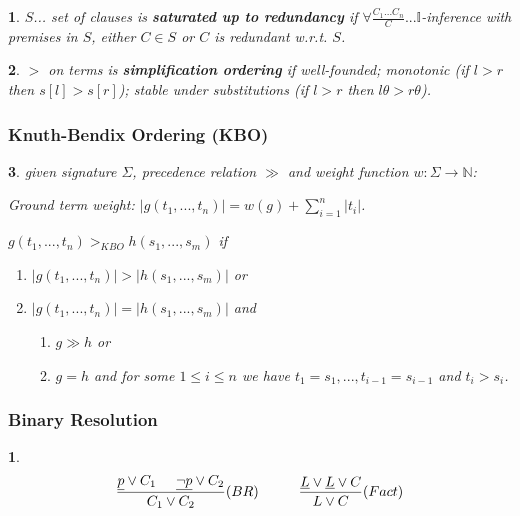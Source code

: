 \documentclass[9pt]{extarticle}
\theoremstyle{theoremstyle}
\newtheorem*{green}{}
\newtheorem*{blue}{}
\begin{document}
\begin{multicols}{3}
\begin{minipage}[t]{.30\textwidth}
\begin{green}
	$S$... set of clauses is \textbf{saturated up to redundancy} if $\forall \frac{C_1...C_n}{C} ... \mathbb{I}$-inference with premises in $S$, either $C \in S$ or $C$ is redundant w.r.t. $S$.
\end{green}

\begin{green}
	$>$ on terms is \textbf{simplification ordering} if well-founded; monotonic (if $l>r$ then $s[l]>s[r]$); stable under substitutions (if $l>r$ then $l\theta > r\theta$).
\end{green}

\end{minipage}

\newpage

\begin{minipage}[t]{.30\textwidth}
	
\subsubsection*{Knuth-Bendix Ordering (KBO)}
\begin{green}
	given signature $\Sigma$, precedence relation $\gg$ and weight function $w:\Sigma \rightarrow \mathbb{N}$:
	
	Ground term weight: $|g(t_1,...,t_n)| = w(g)+ \sum_{i=1}^{n}|t_i|$.
	
	$g(t_1,...,t_n) >_{KBO} h(s_1,...,s_m)$ if
	\begin{enumerate}
		\item $|g(t_1,...,t_n)| > |h(s_1,...,s_m)|$ or
		\item $|g(t_1,...,t_n)| = |h(s_1,...,s_m)|$ and
		\begin{enumerate}
			\item $g\gg h$ or
			\item $g=h$ and for some $1 \leq i \leq n$ we have $t_1=s_1,...,t_{i-1}=s_{i-1}$ and $t_i > s_i$.
		\end{enumerate}
	\end{enumerate}
\end{green}
	
\subsubsection*{Binary Resolution}
\begin{blue}
	\begin{align*}
		\frac{\underline{p}\lor C_1 \hspace{.5cm} \underline{\lnot p} \lor C_2}{C_1 \lor C_2} (BR) \hspace{1cm} \frac{\underline{L}\lor \underline{L} \lor C}{L \lor C} (Fact)
	\end{align*}
\end{blue}



\end{minipage}
\end{multicols}
\end{document}
